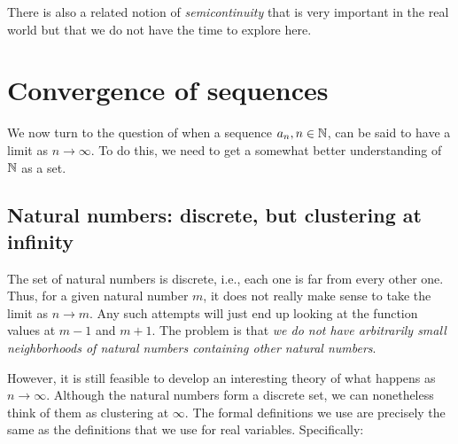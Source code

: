 \documentclass[10pt]{amsart}
\begin{document}
There is also a related notion of {\em semicontinuity} that is very
important in the real world but that we do not have the time to
explore here.

\section{Convergence of sequences}

We now turn to the question of when a sequence $a_n, n \in \mathbb{N}$, can be
said to have a limit as $n \to \infty$. To do this, we need to get a
somewhat better understanding of $\mathbb{N}$ as a set.

\subsection{Natural numbers: discrete, but clustering at infinity}

The set of natural numbers is discrete, i.e., each one is far from
every other one. Thus, for a given natural number $m$, it does not
really make sense to take the limit as $n \to m$. Any such attempts
will just end up looking at the function values at $m - 1$ and $m +
1$. The problem is that {\em we do not have arbitrarily small
neighborhoods of natural numbers containing other natural numbers}.

However, it is still feasible to develop an interesting theory of what
happens as $n \to \infty$. Although the natural numbers form a
discrete set, we can nonetheless think of them as clustering at
$\infty$. The formal definitions we use are precisely the same as the
definitions that we use for real variables. Specifically:
\end{document}

